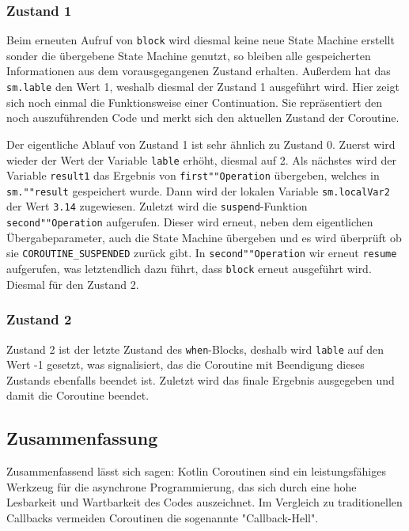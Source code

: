 \documentclass[fontsize=12pt,paper=a4,twoside=semi,parskip=half-,headsepline,headinclude]{scrreprt}
\begin{document}
\subsubsection{Zustand 1}

Beim erneuten Aufruf von \texttt{block} wird diesmal keine neue State Machine erstellt sonder die übergebene State Machine genutzt, so bleiben alle gespeicherten Informationen aus dem vorausgegangenen Zustand erhalten. Außerdem hat das \texttt{sm.lable} den Wert 1, weshalb diesmal der Zustand 1 ausgeführt wird. Hier zeigt sich noch einmal die Funktionsweise einer Continuation. Sie repräsentiert den noch auszuführenden Code und merkt sich den aktuellen Zustand der Coroutine. 

Der eigentliche Ablauf von Zustand 1 ist sehr ähnlich zu Zustand 0. Zuerst wird wieder der Wert der Variable \texttt{lable} erhöht, diesmal auf 2. Als nächstes wird der Variable \texttt{result1} das Ergebnis von \texttt{first""Operation} übergeben, welches in \texttt{sm.""result} gespeichert wurde. Dann wird der lokalen Variable \texttt{sm.localVar2} der Wert \texttt{3.14} zugewiesen. Zuletzt wird die \texttt{suspend}-Funktion \texttt{second""Operation} aufgerufen. Dieser wird erneut, neben dem eigentlichen Übergabeparameter, auch die State Machine übergeben und es wird überprüft ob sie \texttt{COROUTINE\_SUSPENDED} zurück gibt. In \texttt{second""Operation} wir erneut \texttt{resume} aufgerufen, was letztendlich dazu führt, dass \texttt{block} erneut ausgeführt wird. Diesmal für den Zustand 2.

\subsubsection{Zustand 2}

Zustand 2 ist der letzte Zustand des \texttt{when}-Blocks, deshalb wird \texttt{lable} auf den Wert -1 gesetzt, was signalisiert, das die Coroutine mit Beendigung dieses Zustands ebenfalls beendet ist. Zuletzt wird das finale Ergebnis ausgegeben und damit die Coroutine beendet.

\subsection{Zusammenfassung}

Zusammenfassend lässt sich sagen: Kotlin Coroutinen sind ein leistungsfähiges Werkzeug für die asynchrone Programmierung, das sich durch eine hohe Lesbarkeit und Wartbarkeit des Codes auszeichnet. Im Vergleich zu traditionellen Callbacks vermeiden Coroutinen die sogenannte "Callback-Hell".
\end{document}
